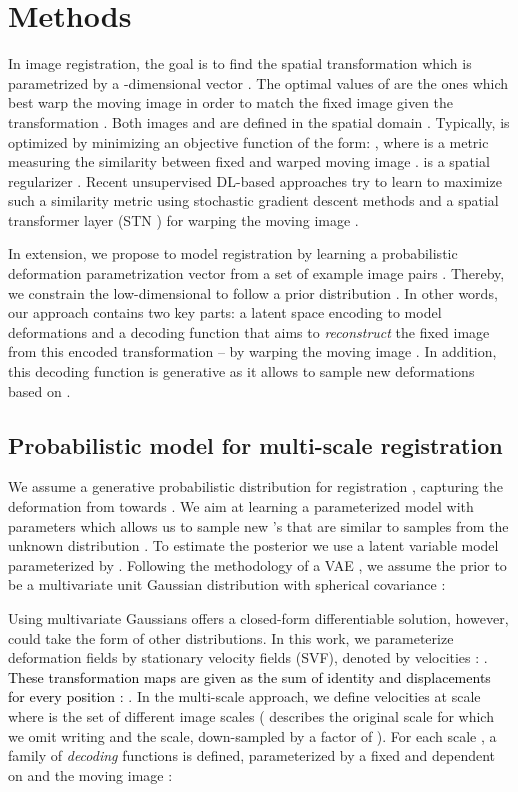 \documentclass[journal]{IEEEtran}
\newcommand{\update}[1]{\textcolor{black}{#1}}
\begin{document}
\section{Methods}
In image registration, the goal is to find the spatial transformation  which is parametrized by a -dimensional vector . The optimal values of  are the ones which best warp the moving image  in order to match the fixed image  given the transformation . Both images  and  are defined in the spatial domain . Typically,  is optimized by minimizing an objective function of the form: , where  is a metric measuring the similarity between fixed  and warped moving image .  is a spatial regularizer \cite{sotiras}. Recent unsupervised DL-based approaches \cite{jason2016back,de2017end,balakrishnan2018unsupervised} try to learn to maximize such a similarity metric  using stochastic gradient descent methods and a spatial transformer layer (STN \cite{jaderberg2015spatial}) for warping the moving image . 

In extension, we propose to model registration by learning a probabilistic deformation parametrization vector  from a set of example image pairs . Thereby, we constrain the low-dimensional  to follow a prior distribution . In other words, our approach contains two key parts: a latent space encoding to model deformations and a decoding function that aims to \emph{reconstruct} the fixed image  from this encoded transformation -- by warping the moving image . In addition, this decoding function is generative as it allows to sample new deformations based on .

\subsection{Probabilistic model for multi-scale registration}
We assume a generative probabilistic distribution for registration , capturing the deformation from  towards . We aim at learning a parameterized model  with parameters  which allows us to sample new 's that are similar to samples from the unknown distribution . To estimate the posterior  we use a latent variable model parameterized by . Following the methodology of a VAE \cite{kingma2013auto}, we assume the prior  to be a multivariate unit Gaussian distribution with spherical covariance :

Using multivariate Gaussians offers a closed-form differentiable solution, however,  could take the form of other distributions. In this work, we parameterize deformation fields  by stationary velocity fields (SVF), denoted by velocities :  \cite{arsigny2006log}. \update{These transformation maps  are given as the sum of identity and displacements  for every position : }. In the multi-scale approach, we define velocities  at scale  where  is the set of different image scales ( describes the original scale for which we omit writing  and  the scale, down-sampled by a factor of ). For each scale , a family of \emph{decoding} functions  is defined, parameterized by a fixed  and dependent on  and the moving image : 
\end{document}
